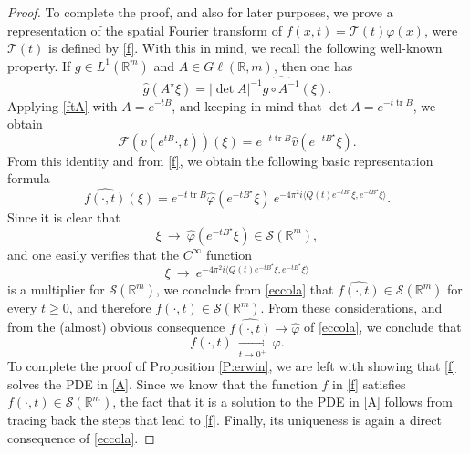 \documentclass[10pt,a4paper]{amsart}
\def \R {\mathbb{R}}
\def \So {\mathscr{S}(\Rm)}
\newcommand{\Rm}{\mathbb R^m}
\newcommand{\da}{\rangle}
\newcommand{\sa}{\langle}
\newcommand{\tr}{\operatorname{tr}}
\newcommand{\vf}{\varphi}
\begin{document}
\begin{proof}
To complete the proof, and also for later purposes, we prove a representation of the spatial Fourier transform of $f(x,t) = \mathcal T(t) \vf(x)$, were $\mathcal T(t)$ is defined by \eqref{f}. With this in mind, we recall the following well-known property. If $g\in L^1(\Rm)$ and $A\in G\ell(\R,m)$, then one has
\begin{equation}\label{ftA}
\hat g(A^\star \xi) = |\operatorname{det} A|^{-1} \widehat{g \circ A^{-1}}(\xi).
\end{equation} 
Applying \eqref{ftA} with $A = e^{-tB}$, and keeping in mind that $\det A = e^{-t \tr B}$, we obtain
\[
\mathscr F(v(e^{t B} \cdot,t))(\xi) = e^{-t \tr B} \hat v(e^{-tB^\star}\xi).
\]
From this identity and from  \eqref{f}, we obtain the following basic representation formula
\begin{equation}\label{eccola}
\widehat{f(\cdot,t)}(\xi) = e^{-t \tr B} \hat \vf(e^{-tB^\star}\xi) \  e^{-4\pi^2 i  \sa Q(t) e^{-tB^\star}\xi,e^{-tB^\star}\xi\da}.
\end{equation}
Since it is clear that 
\[
\xi\ \longrightarrow\ \hat \vf(e^{-tB^\star}\xi) \in \mathscr S(\Rm),
\]
and one easily verifies that the $C^\infty$ function 
\[
\xi\ \longrightarrow\  e^{-4\pi^2 i  \sa Q(t) e^{-tB^\star}\xi,e^{-tB^\star}\xi\da}
\]
is a multiplier for $\mathscr S(\Rm)$, we conclude from \eqref{eccola} that $\widehat{f(\cdot,t)}\in \mathscr S(\Rm)$ for every $t\ge 0$, and therefore $f(\cdot,t) \in \mathscr S(\Rm)$. From these considerations, and from the (almost) obvious consequence $\widehat{f(\cdot,t)}\to \hat \vf$ of \eqref{eccola}, we conclude that 
\[
f(\cdot,t)\ \underset{t\to 0^+}{\longrightarrow}\ \vf.
\]
To complete the proof of Proposition \ref{P:erwin}, we are left with showing that \eqref{f} solves the PDE in \eqref{A}. Since we know that the function $f$ in \eqref{f} satisfies $f(\cdot,t)\in \So$, the fact that it is a solution to the PDE in \eqref{A} follows from tracing back the steps that lead to \eqref{f}. Finally, its uniqueness is again a direct consequence of \eqref{eccola}.

\end{proof}
\end{document}
